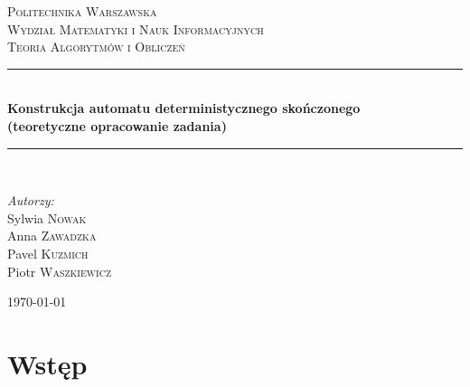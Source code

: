 \documentclass{llncs}
\begin{document}
	
\begin{titlepage}

\newcommand{\HRule}{\rule{\linewidth}{0.5mm}}

\center


\textsc{\LARGE Politechnika Warszawska}\\[5mm]
\textsc{\LARGE Wydział Matematyki i Nauk Informacyjnych}\\[4cm]
 

\textsc{\Large Teoria Algorytmów i Obliczeń}\\[0.5cm]


\HRule \\[0.4cm]
{ \huge \bfseries Konstrukcja automatu deterministycznego skończonego\\(teoretyczne opracowanie zadania)}\\[0.4cm] %
\HRule \\[1.5cm]
 

\begin{flushright}
\Large \emph{Autorzy:}\\[0.5cm]
Sylwia \textsc{Nowak}\\
Anna \textsc{Zawadzka}\\
Pavel \textsc{Kuzmich}\\
Piotr \textsc{Waszkiewicz}\\
\end{flushright}


\vfill
{\large \today}\\[3cm]

\end{titlepage}
	
\tableofcontents
\newpage

\section{Wstęp}
\end{document}
